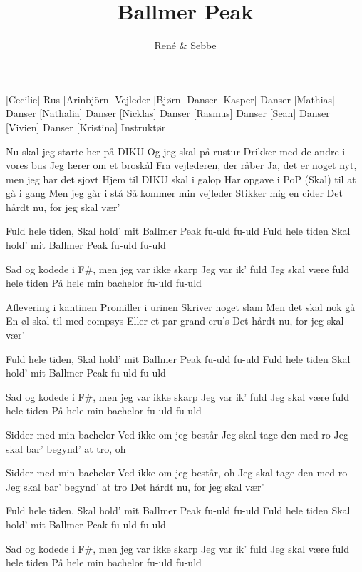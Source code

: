\documentclass[a4paper,11pt]{article}
\title{Ballmer Peak}
\author{René \& Sebbe}
\begin{document}
\maketitle

\begin{roles}
[Cecilie] Rus
[Arinbjörn] Vejleder
[Bjørn] Danser
[Kasper] Danser
[Mathias] Danser
[Nathalia] Danser
[Nicklas] Danser
[Rasmus] Danser
[Sean] Danser
[Vivien] Danser
[Kristina] Instruktør
\end{roles}

\begin{song}
    Nu skal jeg starte her på DIKU
    Og jeg skal på rustur
    Drikker med de andre i vores bus
    Jeg lærer om et broskål
    Fra vejlederen, der råber
    Ja, det er noget nyt, men jeg har det sjovt
    Hjem til DIKU skal i galop
    Har opgave i PoP
    (Skal) til at gå i gang
    Men jeg går i stå
    Så kommer min vejleder
    Stikker mig en cider
    Det hårdt nu, for jeg skal vær’

    Fuld hele tiden,
    Skal hold’ mit Ballmer Peak
    fu-uld
    fu-uld
    Fuld hele tiden
    Skal hold’ mit Ballmer Peak
    fu-uld
    fu-uld

    Sad og kodede i F\#,
    men jeg var ikke skarp
    Jeg var ik’ fuld
    Jeg skal være fuld hele tiden
    På hele min bachelor
    fu-uld
    fu-uld

    Aflevering i kantinen
    Promiller i urinen
    Skriver noget slam
    Men det skal nok gå
    En øl skal til med compsys
    Eller et par grand cru's
    Det hårdt nu, for jeg skal vær’

    Fuld hele tiden,
    Skal hold’ mit Ballmer Peak
    fu-uld
    fu-uld
    Fuld hele tiden
    Skal hold’ mit Ballmer Peak
    fu-uld
    fu-uld

    Sad og kodede i F\#,
    men jeg var ikke skarp
    Jeg var ik’ fuld
    Jeg skal være fuld hele tiden
    På hele min bachelor
    fu-uld
    fu-uld

    Sidder med min bachelor
    Ved ikke om jeg består
    Jeg skal tage den med ro
    Jeg skal bar’ begynd’ at tro, oh

    Sidder med min bachelor
    Ved ikke om jeg består, oh
    Jeg skal tage den med ro
    Jeg skal bar’ begynd’ at tro
    Det hårdt nu, for jeg skal vær’

    Fuld hele tiden,
    Skal hold’ mit Ballmer Peak
    fu-uld
    fu-uld
    Fuld hele tiden
    Skal hold’ mit Ballmer Peak
    fu-uld
    fu-uld


    Sad og kodede i F\#,
    men jeg var ikke skarp
    Jeg var ik’ fuld
    Jeg skal være fuld hele tiden
    På hele min bachelor
    fu-uld
    fu-uld
\end{song}
\end{document}
